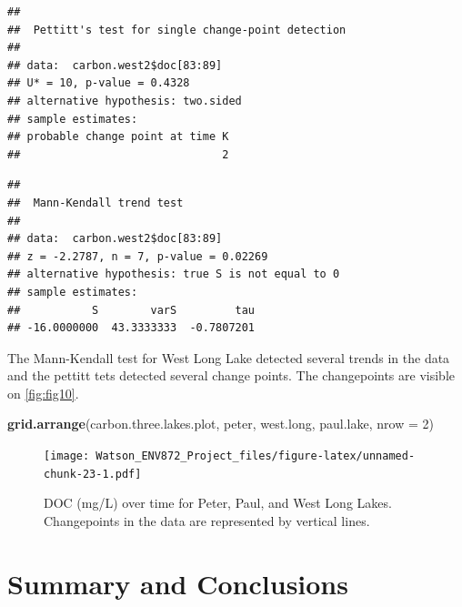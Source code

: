 \documentclass[12pt,]{article}
\newenvironment{Shaded}{\begin{snugshade}}{\end{snugshade}}
\newcommand{\KeywordTok}[1]{\textcolor[rgb]{0.13,0.29,0.53}{\textbf{#1}}}
\newcommand{\DataTypeTok}[1]{\textcolor[rgb]{0.13,0.29,0.53}{#1}}
\newcommand{\DecValTok}[1]{\textcolor[rgb]{0.00,0.00,0.81}{#1}}
\newcommand{\CommentTok}[1]{\textcolor[rgb]{0.56,0.35,0.01}{\textit{#1}}}
\newcommand{\OperatorTok}[1]{\textcolor[rgb]{0.81,0.36,0.00}{\textbf{#1}}}
\newcommand{\NormalTok}[1]{#1}
\begin{document}
\begin{verbatim}
## 
##  Pettitt's test for single change-point detection
## 
## data:  carbon.west2$doc[83:89]
## U* = 10, p-value = 0.4328
## alternative hypothesis: two.sided
## sample estimates:
## probable change point at time K 
##                               2
\end{verbatim}

\begin{Shaded}
\end{Shaded}

\begin{verbatim}
## 
##  Mann-Kendall trend test
## 
## data:  carbon.west2$doc[83:89]
## z = -2.2787, n = 7, p-value = 0.02269
## alternative hypothesis: true S is not equal to 0
## sample estimates:
##           S        varS         tau 
## -16.0000000  43.3333333  -0.7807201
\end{verbatim}

The Mann-Kendall test for West Long Lake detected several trends in the
data and the pettitt tets detected several change points. The
changepoints are visible on \autoref{fig:fig10}.

\begin{Shaded}
\begin{Highlighting}[]
\KeywordTok{grid.arrange}\NormalTok{(carbon.three.lakes.plot, peter, west.long, paul.lake,}
            \DataTypeTok{nrow =} \DecValTok{2}\NormalTok{)}
\end{Highlighting}
\end{Shaded}

\begin{figure}
\centering
\texttt{[image: Watson\_ENV872\_Project\_files/figure-latex/unnamed-chunk-23-1.pdf]}
\caption{\label{fig:fig10} DOC (mg/L) over time for Peter, Paul, and
West Long Lakes. Changepoints in the data are represented by vertical
lines.}
\end{figure}

\newpage

\section{Summary and Conclusions}\label{summary-and-conclusions}
\end{document}
